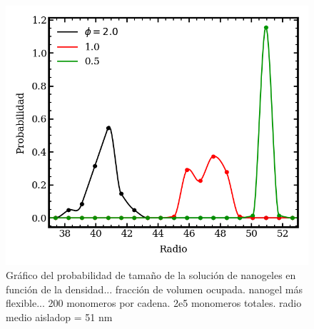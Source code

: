 \begin{figure}[!tb]
	\centering
	\includegraphics[width=1\linewidth]{Figures/graph-mc/denton.png}
	\caption{Gr\'afico del probabilidad de tama\~no de la soluci\'on de  nanogeles en funci\'on de la densidad... fracci\'on de volumen ocupada. nanogel m\'as flexible... 200 monomeros por cadena. 2e5 monomeros totales. radio medio aisladop = 51 nm }
	\label{fig:mc:dentos-sizes}
\end{figure}
